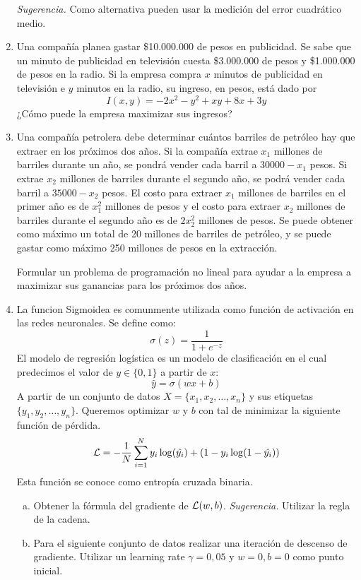 \documentclass[12pt]{article}
\begin{document}
\begin{center}
\begin{enumerate}
            \emph{Sugerencia.} Como alternativa pueden usar la medición del error cuadrático medio.

            \item Una compañía planea gastar \$10.000.000 de pesos en publicidad. 
            Se sabe que un minuto de publicidad en televisión cuesta \$3.000.000 de pesos y \$1.000.000 de pesos en la radio. 
            Si la empresa compra $x$ minutos de publicidad en televisión e $y$ minutos en la radio, su ingreso, en pesos, está dado por
            \[
             I(x,y) = -2x^{2} - y^{2} + xy + 8x + 3y
            \]
            ¿Cómo puede la empresa maximizar sus ingresos?

            \item Una compañía petrolera debe determinar cuántos barriles de petróleo hay que extraer en los próximos dos años. 
            Si la compañía extrae $x_{1}$ millones de barriles durante un año, se
            pondrá vender cada barril a $30000-x_{1}$ pesos. Si extrae $x_{2}$ millones de barriles durante el segundo año, se podrá vender cada barril a $35000-x_{2}$ pesos. El costo para extraer $x_{1}$ millones de barriles en el primer año es de $x_{1}^{2}$
            millones de pesos y el costo para extraer $x_{2}$ millones de barriles durante el segundo año es de $2x_{2}^{2}$ millones de pesos. 
            Se puede obtener como máximo un total de 20 millones de barriles de petróleo, y se puede gastar como máximo 250 millones de pesos en la extracción. 

            Formular un problema de programación no lineal para ayudar a la empresa a maximizar
            sus ganancias para los próximos dos años.

            \item La funcion Sigmoidea es comunmente utilizada como función de activación
            en las redes neuronales. 
            Se define como:
            \[
             \sigma(z) = \frac{1}{1+e^{-z}}
            \]
            El modelo de regresión logística es un modelo de clasificación en el cual predecimos el valor de $y \in \{0,1\}$ a partir de $x$:
            \[
             \hat{y} = \sigma(wx + b)
            \]
            A partir de un conjunto de datos $X = \{x_{1},x_{2},\dots,x_{n}\}$ y sus etiquetas $\{y_{1},y_{2}, \dots, y_{n}\}$.
            Queremos optimizar $w$ y $b$ con tal de minimizar la siguiente función de pérdida.
            \[
             {\cal L} = -\frac{1}{N} \sum_{i=1}^{N} y_{i}\log(\hat{y_{i}}) + (1-y_{i}\log(1-\hat{y_{i}}))
            \]
            Esta función se conoce como entropía cruzada binaria.
            \begin{enumerate}[a)]
                \item Obtener la fórmula del gradiente de ${\cal L}(w,b)$.
                    \emph{Sugerencia.} Utilizar la regla de la cadena.
                \item Para el siguiente conjunto de datos realizar una iteración de descenso de gradiente.
                Utilizar un learning rate $\gamma = 0,05$ y $w=0, b =0$ como punto inicial.



\end{enumerate}
\end{enumerate}
\end{center}
\end{document}
